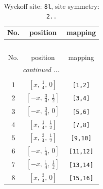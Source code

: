 \documentclass[fleqn,8pt]{jsarticle}
\begin{document}
\begin{longtable}{ccc}
\caption{Wyckoff site: {\tt 8l}, site symmetry: {\tt 2..}}
 \\
 \hline \hline
No. & position & mapping \\ \hline \endfirsthead

\multicolumn{2}{l}{\tablename\ \thetable{}} \\
 \hline \hline
No. & position & mapping \\ \hline \endhead

 \hline \hline
\multicolumn{2}{r}{\footnotesize\it continued ...} \\ \endfoot

 \hline \hline
\multicolumn{2}{r}{} \\ \endlastfoot

1 & $\left[ x,\, \frac{1}{4},\, 0 \right]$ & {\tt [1,2]} \\ \hline
2 & $\left[ - x,\, \frac{3}{4},\, \frac{1}{2} \right]$ & {\tt [3,4]} \\ \hline
3 & $\left[ - x,\, \frac{3}{4},\, 0 \right]$ & {\tt [5,6]} \\ \hline
4 & $\left[ x,\, \frac{1}{4},\, \frac{1}{2} \right]$ & {\tt [7,8]} \\ \hline
5 & $\left[ x,\, \frac{3}{4},\, \frac{1}{2} \right]$ & {\tt [9,10]} \\ \hline
6 & $\left[ - x,\, \frac{1}{4},\, 0 \right]$ & {\tt [11,12]} \\ \hline
7 & $\left[ - x,\, \frac{1}{4},\, \frac{1}{2} \right]$ & {\tt [13,14]} \\ \hline
8 & $\left[ x,\, \frac{3}{4},\, 0 \right]$ & {\tt [15,16]} \\
\end{longtable}
\renewcommand{\arraystretch}{1.2}
\end{document}
